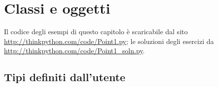 \documentclass[10pt]{book}
\begin{document}









\chapter{Classi e oggetti}

Il codice degli esempi di questo capitolo è scaricabile dal sito
\url{http://thinkpython.com/code/Point1.py}; le soluzioni degli esercizi da
\url{http://thinkpython.com/code/Point1_soln.py}.


\section{Tipi definiti dall'utente}
\label{point}
\end{document}
